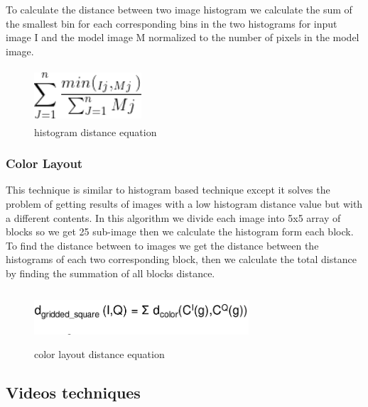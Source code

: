 To calculate the distance between two image histogram we calculate the sum of the
smallest bin for each corresponding bins in the two histograms
for input image I and the model image M normalized to the
number of pixels in the model image.
\vskip 0.2in

\begin{figure}[H]
    \centering
    \includegraphics[width=40mm,height=20mm]{Images/eq.png}
    \caption{histogram distance equation}
  \end{figure}

  \vskip 0.2in
\subsubsection{Color Layout}
This technique is similar to histogram based technique except it solves the problem of getting results of images with a low 
histogram distance value but with a different contents.
\vskip 0.2in
In this algorithm we divide each image into 5x5 array of blocks so we get 25 sub-image then we calculate the histogram form each block.
To find the distance between to images we get the distance between the histograms of each two corresponding block, 
then we calculate the total distance by finding the summation of all blocks distance.
\vskip 0.2in

\begin{figure}[H]
    \centering
    \includegraphics[width=80mm,height=20mm]{Images/cl.png}
    \caption{color layout distance equation}
  \end{figure}
  
  \vskip 0.2in

\subsection{Videos techniques}
